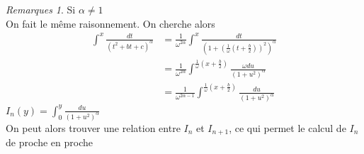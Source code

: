 \documentclass[fleqn]{article}
\theoremstyle{definition} \newtheorem*{defi}{D\'efinition}
\theoremstyle{definition} \newtheorem*{theo}{Th\'eor\`eme}
\theoremstyle{remark} \newtheorem*{rqs}{Remarques}
\theoremstyle{definition} \newtheorem*{prop}{Propri\'et\'e}
\begin{document}
\begin{rqs} Si $\alpha \neq 1$ \\
	On fait le m\^eme raisonnement. On cherche alors
	\begin{align*}
		\int^{x} \frac{dt}{(t^2 + bt + c)^{\alpha}} &= \frac{1}{\omega^{2\alpha}}\int^{x}
			\frac{dt}{(1 + (\frac{1}{\omega}(t + \frac{b}{2}))^2)^\alpha}\\
		&= \frac{1}{\omega^{2\alpha}}\int^{\frac{1}{\omega}(x + \frac{b}{2})} \frac{\omega du}
			{(1 + u^2)^\alpha} \\
		&= \frac{1}{\omega^{2\alpha -1}}\int^{\frac{1}{\omega}(x + \frac{b}{2})} \frac{du}
			{(1 + u^2)^\alpha}
	\end{align*}
$I_n(y) = \int_{0}^{y} \frac{du}{(1+u^2)^\alpha}$ \\
On peut alors trouver une relation entre $I_n$ et $I_{n+1}$, ce qui permet le calcul de $I_n$ de proche en proche
\end{rqs}
\end{document}
